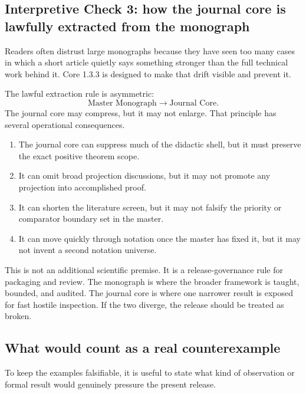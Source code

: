 \subsection{Interpretive Check 3: how the journal core is lawfully extracted from the monograph}

Readers often distrust large monographs because they have seen too many cases in which a short
article quietly says something stronger than the full technical work behind it. Core 1.3.3 is
designed to make that drift visible and prevent it.

The lawful extraction rule is asymmetric:
\[
\text{Master Monograph} \longrightarrow \text{Journal Core}.
\]
The journal core may compress, but it may not enlarge. That principle has several operational
consequences.

\begin{enumerate}
\item The journal core can suppress much of the didactic shell, but it must preserve the exact
      positive theorem scope.
\item It can omit broad projection discussions, but it may not promote any projection into
      accomplished proof.
\item It can shorten the literature screen, but it may not falsify the priority or comparator
      boundary set in the master.
\item It can move quickly through notation once the master has fixed it, but it may not invent a
      second notation universe.
\end{enumerate}

This is not an additional scientific premise. It is a release-governance rule for packaging and review. The
monograph is where the broader framework is taught, bounded, and audited. The journal core is
where one narrower result is exposed for fast hostile inspection. If the two diverge, the release
should be treated as broken.

\subsection{What would count as a real counterexample}

To keep the examples falsifiable, it is useful to state what kind of observation or formal result
would genuinely pressure the present release.

